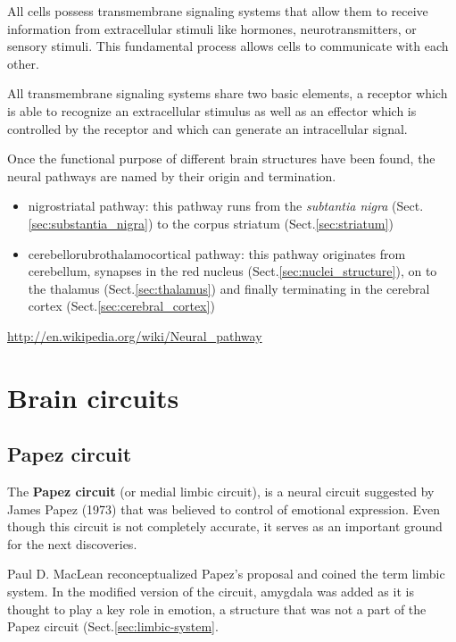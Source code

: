 All cells possess transmembrane signaling systems
that allow them to receive information from extracellular
stimuli like hormones, neurotransmitters, or sensory
stimuli. This fundamental process allows cells to communicate
with each other.

All transmembrane signaling systems share two basic elements, a receptor which
is able to recognize an extracellular stimulus as well as an effector which is
controlled by the receptor and which can generate an intracellular signal.

Once the functional purpose of different brain structures have been found,
the neural pathways are named by their origin and termination.
\begin{itemize}
  \item nigrostriatal pathway: this pathway runs from the {\it subtantia nigra}
  (Sect.\ref{sec:substantia_nigra}) to the corpus striatum (Sect.\ref{sec:striatum})
  
  \item cerebellorubrothalamocortical pathway: this pathway originates from
  cerebellum, synapses in the red nucleus (Sect.\ref{sec:nuclei_structure}), on
  to the thalamus (Sect.\ref{sec:thalamus}) and finally terminating in the
  cerebral cortex (Sect.\ref{sec:cerebral_cortex})
\end{itemize}

\url{http://en.wikipedia.org/wiki/Neural_pathway}


\section{Brain circuits}

\subsection{Papez circuit}
\label{sec:Papez_circuit}

The {\bf Papez circuit} (or medial limbic circuit), is a neural circuit
suggested by James Papez (1973) that was believed to control of emotional
expression. Even though this circuit is not completely accurate, it serves
as an important ground for the next discoveries.

Paul D. MacLean reconceptualized Papez's proposal and coined the term limbic
system. In the modified version of the circuit, amygdala was added as it is
thought to play a key role in emotion, a structure that was not a part of the
Papez circuit (Sect.\ref{sec:limbic-system}.

